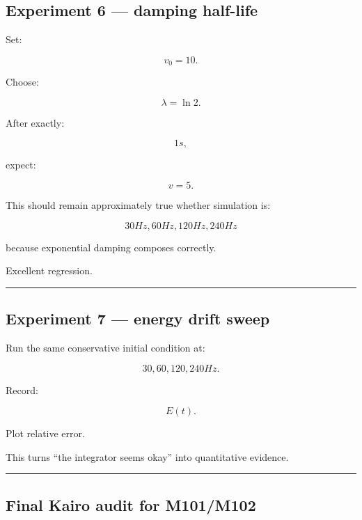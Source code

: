 \subsection{Experiment 6 --- damping half-life}\label{06-engine-ii-ch039-experiment-6-damping-half-life}

Set:

\[
v_0=10.
\]

Choose:

\[
\lambda=\ln2.
\]

After exactly:

\[
1s,
\]

expect:

\[
v=5.
\]

This should remain approximately true whether simulation is:

\[
30Hz,
60Hz,
120Hz,
240Hz
\]

because exponential damping composes correctly.

Excellent regression.

\begin{center}\rule{0.5\linewidth}{0.5pt}\end{center}

\subsection{Experiment 7 --- energy drift sweep}\label{06-engine-ii-ch039-experiment-7-energy-drift-sweep}

Run the same conservative initial condition at:

\[
30,60,120,240Hz.
\]

Record:

\[
E(t).
\]

Plot relative error.

This turns ``the integrator seems okay'' into quantitative evidence.

\begin{center}\rule{0.5\linewidth}{0.5pt}\end{center}

\subsection{Final Kairo audit for M101/M102}\label{06-engine-ii-ch039-final-kairo-audit-for-m101m102}

